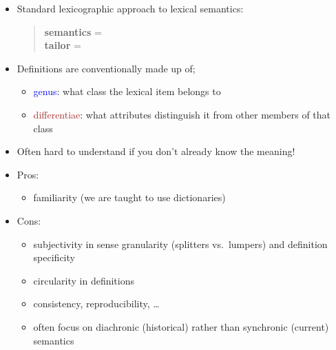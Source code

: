 \documentclass[a4paper,landscape,headrule,footrule,xetex]{foils}
\begin{document}
\begin{itemize}
\item Standard lexicographic approach to lexical semantics:
  \begin{quote}
    \textbf{semantics} = \\
    \textbf{tailor} = 
  \end{quote}
\item Definitions are conventionally made up of;
  \begin{itemize}
  \item \textcolor{blue}{genus}: what class the lexical item belongs to
  \item \textcolor{brown}{differentiae}: what attributes distinguish it from
  other members of that class
\end{itemize}
\item Often hard to understand if you don't already know the meaning!
\item Pros:
  \begin{itemize}
  \item familiarity (we are taught to use dictionaries)
  \end{itemize}
\item Cons:
  \begin{itemize}
  \item subjectivity in sense granularity (splitters vs.\ lumpers) and
    definition specificity
  \item circularity in definitions
  \item consistency, reproducibility, \ldots
  \item often focus on diachronic (historical) rather than synchronic (current) semantics 
  \end{itemize}
\end{itemize}
\end{document}
